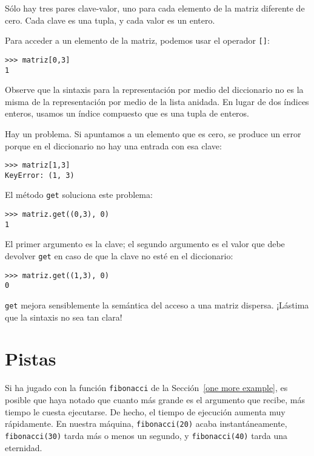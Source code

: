 Sólo hay tres pares clave-valor, uno para cada elemento de la matriz
diferente de cero. Cada clave es una tupla, y cada valor es un entero.

Para acceder a un elemento de la matriz, podemos usar el operador
\texttt{{[}{]}}:
\begin{lstlisting}
>>> matriz[0,3]
1
\end{lstlisting}

Observe que la sintaxis para la representación por medio del diccionario
no es la misma de la representación por medio de la lista anidada.
En lugar de dos índices enteros, usamos un índice compuesto que es
una tupla de enteros.

Hay un problema. Si apuntamos a un elemento que es cero, se produce
un error porque en el diccionario no hay una entrada con esa clave:

\begin{lstlisting}
>>> matriz[1,3]
KeyError: (1, 3)
\end{lstlisting}

El método \texttt{get} soluciona este problema:
\begin{lstlisting}
>>> matriz.get((0,3), 0)
1
\end{lstlisting}

El primer argumento es la clave; el segundo argumento es el valor
que debe devolver \texttt{get} en caso de que la clave no esté en
el diccionario:
\begin{lstlisting}
>>> matriz.get((1,3), 0)
0
\end{lstlisting}

\texttt{get} mejora sensiblemente la semántica del acceso a una matriz
dispersa. ¡Lástima que la sintaxis no sea tan clara!

\section{Pistas}

 

Si ha jugado con la función \texttt{fibonacci} de la Sección~\ref{one more example},
es posible que haya notado que cuanto más grande es el argumento que
recibe, más tiempo le cuesta ejecutarse. De hecho, el tiempo de ejecución
aumenta muy rápidamente. En nuestra máquina, \texttt{fibonacci(20)}
acaba instantáneamente, \texttt{fibonacci(30)} tarda más o menos un
segundo, y \texttt{fibonacci(40)} tarda una eternidad.

